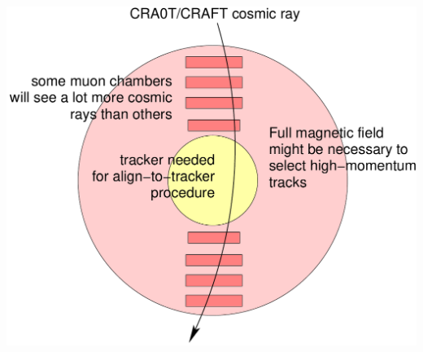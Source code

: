 \documentclass[compress]{beamer}
\begin{document}
\begin{frame}
\begin{columns}
\includegraphics[width=\linewidth]{craft.pdf}
\end{columns}
\end{frame}
\end{document}
